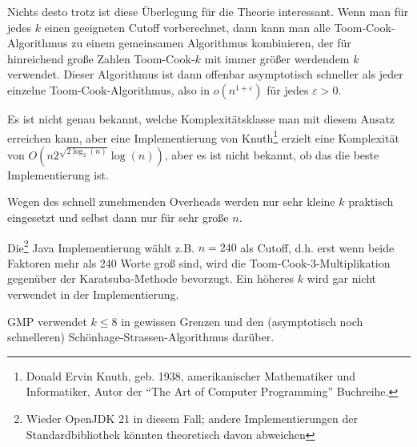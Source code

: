 \begin{remark}
    Nichts desto trotz ist diese Überlegung für die Theorie interessant. Wenn man für jedes $k$ einen geeigneten Cutoff vorberechnet, dann kann man alle Toom-Cook-Algorithmus zu einem gemeinsamen Algorithmus kombinieren, der für hinreichend große Zahlen Toom-Cook-$k$ mit immer größer werdendem $k$ verwendet. Dieser Algorithmus ist dann offenbar asymptotisch schneller als jeder einzelne Toom-Cook-Algorithmus, also in $o(n^{1+\varepsilon})$ für jedes $\varepsilon>0$.

    \smallskip
    Es ist nicht genau bekannt, welche Komplexitätsklasse man mit diesem Ansatz erreichen kann, aber eine Implementierung von Knuth\footnote{Donald Ervin Knuth, geb. 1938, amerikanischer Mathematiker und Informatiker, Autor der \enquote{The Art of Computer Programming} Buchreihe.} erzielt eine Komplexität von $O(n 2^{\sqrt{2 \log_2(n)}} \log(n))$, aber es ist nicht bekannt, ob das die beste Implementierung ist.
\end{remark}

\begin{remark}
    Wegen des schnell zunehmenden Overheads werden nur sehr kleine $k$ praktisch eingesetzt und selbst dann nur für sehr große $n$.

    \smallskip
    Die\footnote{Wieder OpenJDK 21 in diesem Fall; andere Implementierungen der Standardbibliothek könnten theoretisch davon abweichen} Java Implementierung wählt z.B. $n=240$ als Cutoff, d.h. erst wenn beide Faktoren mehr als 240 Worte groß sind, wird die Toom-Cook-$3$-Multiplikation gegenüber der Karatsuba-Methode bevorzugt. Ein höheres $k$ wird gar nicht verwendet in der Implementierung.

    \smallskip
    GMP verwendet $k\leq 8$ in gewissen Grenzen und den (asymptotisch noch schnelleren) Schönhage-Strassen-Algorithmus darüber.
\end{remark}